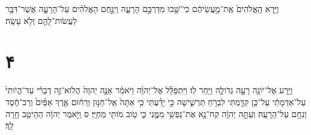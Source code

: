 \documentclass{openreader}
\begin{document}
וַיַּ֤רְא הָֽאֱלֹהִים֙ אֶֽת־מַ֣עֲשֵׂיהֶ֔ם כִּי־שָׁ֖בוּ מִדַּרְכָּ֣ם הָרָעָ֑ה וַיִּנָּ֣חֶם הָאֱלֹהִ֗ים עַל־הָרָעָ֛ה אֲשֶׁר־דִּבֶּ֥ר לַעֲשֹׂות־לָהֶ֖ם וְלֹ֥א עָשָֽׂה׃ \section*{۴}
וַיֵּ֥רַע אֶל־יֹונָ֖ה רָעָ֣ה גְדֹולָ֑ה וַיִּ֖חַר לֹֽו׃ וַיִּתְפַּלֵּ֨ל אֶל־יְהוָ֜ה וַיֹּאמַ֗ר אָנָּ֤ה יְהוָה֙ הֲלֹוא־זֶ֣ה דְבָרִ֗י עַד־הֱיֹותִי֙ עַל־אַדְמָתִ֔י עַל־כֵּ֥ן קִדַּ֖מְתִּי לִבְרֹ֣חַ תַּרְשִׁ֑ישָׁה כִּ֣י יָדַ֗עְתִּי כִּ֤י אַתָּה֙ אֵֽל־חַנּ֣וּן וְרַח֔וּם אֶ֤רֶךְ אַפַּ֨יִם֙ וְרַב־חֶ֔סֶד וְנִחָ֖ם עַל־הָרָעָֽה׃ וְעַתָּ֣ה יְהוָ֔ה קַח־נָ֥א אֶת־נַפְשִׁ֖י מִמֶּ֑נִּי כִּ֛י טֹ֥וב מֹותִ֖י מֵחַיָּֽי׃ ס וַיֹּ֣אמֶר יְהוָ֔ה הַהֵיטֵ֖ב חָ֥רָה לָֽךְ׃ 
\end{document}
